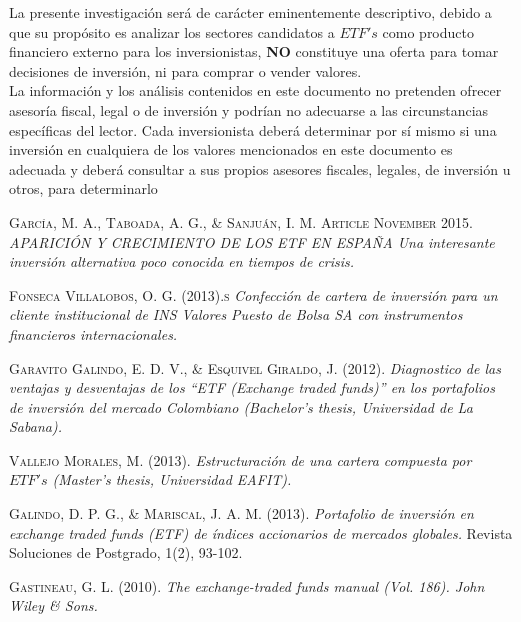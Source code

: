\documentclass[12pt]{book} %
\begin{document}
La presente investigación será de carácter eminentemente descriptivo, debido a que su propósito es analizar los sectores candidatos a $ETF's$ como producto financiero externo para los inversionistas, \textbf{NO} constituye una oferta para tomar decisiones de inversión, ni para comprar o vender valores.\\

La información y los análisis contenidos en este documento no pretenden ofrecer asesoría fiscal, legal o de inversión y podrían no adecuarse a las circunstancias específicas del lector. Cada inversionista deberá determinar por sí mismo si una
inversión en cualquiera de los valores mencionados en este documento es adecuada y deberá consultar a sus propios asesores fiscales, legales, de inversión u otros, para determinarlo



\begin{thebibliography}{10}

 \textsc{García, M. A., Taboada, A. G., \& Sanjuán, I. M. Article November 2015.}
\textit{APARICIÓN Y CRECIMIENTO DE LOS ETF EN ESPAÑA Una interesante inversión alternativa poco conocida en tiempos de crisis.}


 \textsc{Fonseca Villalobos, O. G. (2013).s} \textit{ Confección de cartera de inversión para un cliente institucional de INS Valores Puesto de Bolsa SA con instrumentos financieros internacionales.}


 \textsc{Garavito Galindo, E. D. V., \& Esquivel Giraldo, J. (2012).}
\textit{Diagnostico de las ventajas y desventajas de los “ETF (Exchange traded funds)” en los portafolios de inversión del mercado Colombiano (Bachelor's thesis, Universidad de La Sabana).}

 \textsc{Vallejo Morales, M. (2013).}
\textit{Estructuración de una cartera compuesta por $ETF's$ (Master's thesis, Universidad EAFIT).}

 \textsc{Galindo, D. P. G., \& Mariscal, J. A. M. (2013).}
\textit{ Portafolio de inversión en exchange traded funds (ETF) de índices accionarios de mercados globales.} Revista Soluciones de Postgrado, 1(2), 93-102.


 \textsc{Gastineau, G. L. (2010).}
\textit{  The exchange-traded funds manual (Vol. 186). John Wiley \& Sons.} 

 




\end{thebibliography}
\end{document}
